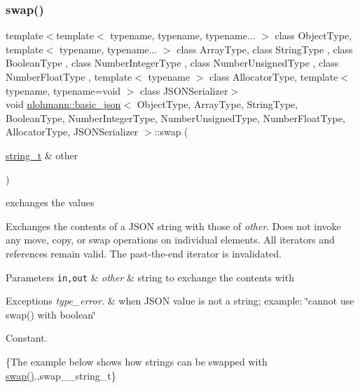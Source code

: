 \subsubsection{\texorpdfstring{swap()}{swap()}\hspace{0.1cm}{\footnotesize\ttfamily [4/4]}}
{\footnotesize\ttfamily template$<$template$<$ typename, typename, typename... $>$ class Object\+Type, template$<$ typename, typename... $>$ class Array\+Type, class String\+Type , class Boolean\+Type , class Number\+Integer\+Type , class Number\+Unsigned\+Type , class Number\+Float\+Type , template$<$ typename $>$ class Allocator\+Type, template$<$ typename, typename=void $>$ class J\+S\+O\+N\+Serializer$>$ \\
void \hyperlink{classnlohmann_1_1basic__json}{nlohmann\+::basic\+\_\+json}$<$ Object\+Type, Array\+Type, String\+Type, Boolean\+Type, Number\+Integer\+Type, Number\+Unsigned\+Type, Number\+Float\+Type, Allocator\+Type, J\+S\+O\+N\+Serializer $>$\+::swap (\begin{DoxyParamCaption}\item[{\hyperlink{classnlohmann_1_1basic__json_a61f8566a1a85a424c7266fb531dca005}{string\+\_\+t} \&}]{other }\end{DoxyParamCaption})\hspace{0.3cm}{\ttfamily [inline]}}



exchanges the values 

Exchanges the contents of a J\+S\+ON string with those of {\itshape other}. Does not invoke any move, copy, or swap operations on individual elements. All iterators and references remain valid. The past-\/the-\/end iterator is invalidated.


\begin{DoxyParams}[1]{Parameters}
\mbox{\tt in,out}  & {\em other} & string to exchange the contents with\\
\hline
\end{DoxyParams}

\begin{DoxyExceptions}{Exceptions}
{\em type\+\_\+error.} & when J\+S\+ON value is not a string; example\+: {\ttfamily \char`\"{}cannot
use swap() with boolean\char`\"{}}\\
\hline
\end{DoxyExceptions}
Constant.

\{The example below shows how strings can be swapped with {\ttfamily \hyperlink{classnlohmann_1_1basic__json_a8c9d932353e1ab98a7dc2fc27e002031}{swap()}}.,swap\+\_\+\+\_\+string\+\_\+t\}


